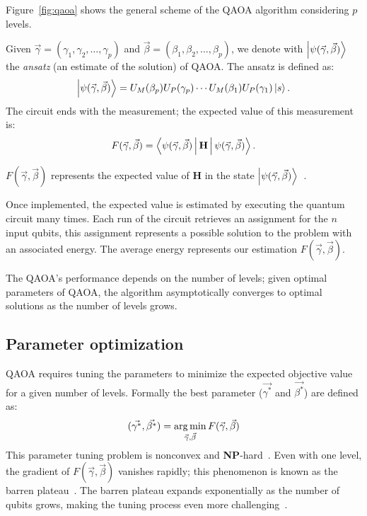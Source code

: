 Figure~\ref{fig:qaoa} shows the general scheme of the QAOA algorithm considering $p$ levels.

Given $\vec{\gamma} = (\gamma_1, \gamma_2,\dots,\gamma_p)$ and $\vec{\beta} = (\beta_1, \beta_2,\dots,\beta_p)$, we denote with $\Ket{\psi(\vec{\gamma},\vec{\beta})}$ the \emph{ansatz} (an estimate of the solution) of QAOA. The ansatz is defined as:
\begin{equation}
\Ket{\psi(\vec{\gamma},\vec{\beta})} = U_M(\beta_p)U_P(\gamma_p)\cdots U_M(\beta_1)U_P(\gamma_1)\Ket{s}.
\label{eq:qaoa_state}
\end{equation}
The circuit ends with the measurement; the expected value of this measurement is:
\begin{equation}
F(\vec{\gamma},\vec{\beta}) =\Braket{\psi(\vec{\gamma},\vec{\beta}) | \mathbf{H} | \psi(\vec{\gamma},\vec{\beta})}.
\label{eq:qaoa_value}
\end{equation}

$F(\vec{\gamma},\vec{\beta})$ represents the expected value of $\mathbf{H}$ in the state $\Ket{\psi(\vec{\gamma},\vec{\beta})}$~\cite{fakhimi2023quantum}. 

Once implemented, the expected value is estimated by executing the quantum circuit many times. Each run of the circuit  retrieves an assignment for the $n$ input qubits, this assignment represents a possible solution to the problem with an associated energy. The average energy represents our estimation $F(\vec{\gamma},\vec{\beta})$.


The QAOA’s performance depends on the number of levels; given optimal parameters of QAOA, the algorithm asymptotically converges to optimal solutions as the number of levels grows\cite{farhi2014quantum}.

\subsection{Parameter optimization}
\label{sec:param_opt}
QAOA requires tuning the parameters to minimize the expected objective value for a given number of levels. Formally the best parameter ($\vec{\gamma^*}$ and $\vec{\beta^*}$) are defined as:
\begin{equation}
(\vec{\gamma^*},\vec{\beta^*}) = \operatorname*{arg\,min}_{\vec{\gamma},\vec{\beta}} F(\vec{\gamma},\vec{\beta}) 
\label{eqn:optimized}
\end{equation}
This parameter tuning problem is nonconvex and \textbf{NP}-hard~\cite{fakhimi2023quantum}. Even with one level, the gradient of $F(\vec{\gamma},\vec{\beta})$  vanishes rapidly; this phenomenon is known as the barren plateau~\cite{arrasmith2021effect, mcclean2018barren}. The barren plateau expands exponentially as the number of qubits
grows, making the tuning process even more challenging~\cite{mcclean2018barren}.

